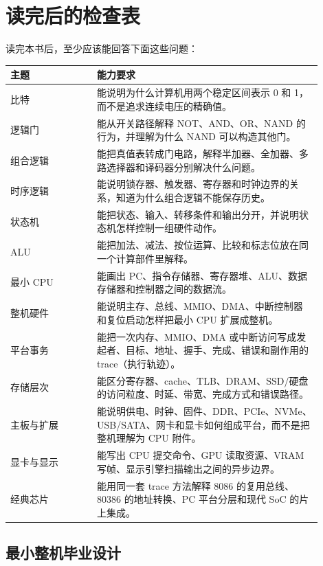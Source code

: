 \chapter*{读完后的检查表}

读完本书后，至少应该能回答下面这些问题：

\begin{longtable}{L{0.25\linewidth}L{0.65\linewidth}}
\toprule
主题 & 能力要求 \\
\midrule
比特 & 能说明为什么计算机用两个稳定区间表示 0 和 1，而不是追求连续电压的精确值。 \\\tablerowrule
逻辑门 & 能从开关路径解释 NOT、AND、OR、NAND 的行为，并理解为什么 NAND 可以构造其他门。 \\\tablerowrule
组合逻辑 & 能把真值表转成门电路，解释半加器、全加器、多路选择器和译码器分别解决什么问题。 \\\tablerowrule
时序逻辑 & 能说明锁存器、触发器、寄存器和时钟边界的关系，知道为什么组合逻辑不能保存历史。 \\\tablerowrule
状态机 & 能把状态、输入、转移条件和输出分开，并说明状态机怎样控制一组硬件动作。 \\\tablerowrule
ALU & 能把加法、减法、按位运算、比较和标志位放在同一个计算部件里解释。 \\\tablerowrule
最小 CPU & 能画出 PC、指令存储器、寄存器堆、ALU、数据存储器和控制器之间的数据流。 \\\tablerowrule
整机硬件 & 能说明主存、总线、MMIO、DMA、中断控制器和复位启动怎样把最小 CPU 扩展成整机。 \\\tablerowrule
平台事务 & 能把一次内存、MMIO、DMA 或中断访问写成发起者、目标、地址、握手、完成、错误和副作用的 trace（执行轨迹）。 \\\tablerowrule
存储层次 & 能区分寄存器、cache、TLB、DRAM、SSD/硬盘的访问粒度、时延、带宽、完成方式和错误路径。 \\\tablerowrule
主板与扩展 & 能说明供电、时钟、固件、DDR、PCIe、NVMe、USB/SATA、网卡和显卡如何组成平台，而不是把整机理解为 CPU 附件。 \\\tablerowrule
显卡与显示 & 能写出 CPU 提交命令、GPU 读取资源、VRAM 写帧、显示引擎扫描输出之间的异步边界。 \\\tablerowrule
经典芯片 & 能用同一套 trace 方法解释 8086 的复用总线、80386 的地址转换、PC 平台分层和现代 SoC 的片上集成。 \\
\bottomrule
\end{longtable}

\section*{最小整机毕业设计}

